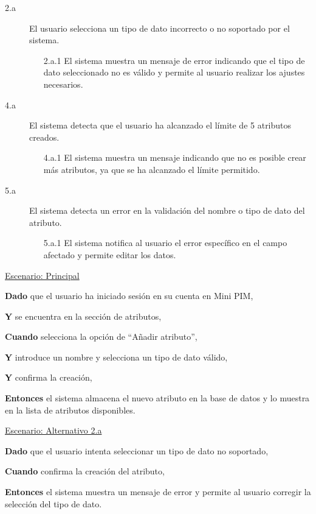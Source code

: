 \begin{description}
    \item[2.a] El usuario selecciona un tipo de dato incorrecto o no soportado por el sistema.
    \begin{enumerate}
        \item[2.a.1] El sistema muestra un mensaje de error indicando que el tipo de dato seleccionado no es válido y permite al usuario realizar los ajustes necesarios.
    \end{enumerate}

    \item[4.a] El sistema detecta que el usuario ha alcanzado el límite de 5 atributos creados.
    \begin{enumerate}
        \item[4.a.1] El sistema muestra un mensaje indicando que no es posible crear más atributos, ya que se ha alcanzado el límite permitido.
    \end{enumerate}

    \item[5.a] El sistema detecta un error en la validación del nombre o tipo de dato del atributo.
    \begin{enumerate}
        \item[5.a.1] El sistema notifica al usuario el error específico en el campo afectado y permite editar los datos.
    \end{enumerate}
\end{description}

\underline{Escenario: Principal}\par
\vspace{0.15cm}
\textbf{Dado} que el usuario ha iniciado sesión en su cuenta en Mini PIM,\par
\textbf{Y} se encuentra en la sección de atributos,\par
\textbf{Cuando} selecciona la opción de “Añadir atributo”,\par
\textbf{Y} introduce un nombre y selecciona un tipo de dato válido,\par
\textbf{Y} confirma la creación,\par
\textbf{Entonces} el sistema almacena el nuevo atributo en la base de datos y lo muestra en la lista de atributos disponibles.\par
\vspace{0.20cm}

\underline{Escenario: Alternativo 2.a}\par
\vspace{0.15cm}
\textbf{Dado} que el usuario intenta seleccionar un tipo de dato no soportado,\par
\textbf{Cuando} confirma la creación del atributo,\par
\textbf{Entonces} el sistema muestra un mensaje de error y permite al usuario corregir la selección del tipo de dato.\par
\vspace{0.20cm}

